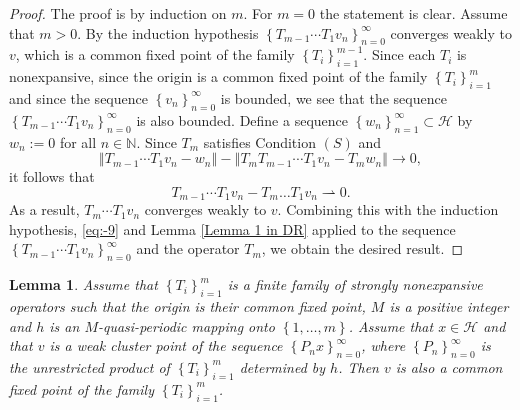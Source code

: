 \documentclass[]{interact}
\theoremstyle{plain}%
\newtheorem{lemma}[theorem]{Lemma}
\theoremstyle{definition}
\theoremstyle{remark}
\begin{document}
\begin{proof}
The proof is by induction on $m$. For $m=0$ the statement is clear.
Assume that $m>0$. By the induction hypothesis $\left\{ T_{m-1}\cdots T_{1}v_{n}\right\} _{n=0}^{\infty}$
converges weakly to $v$, which is a common fixed point of the family
$\left\{ T_{i}\right\} _{i=1}^{m-1}$. Since each $T_{i}$ is nonexpansive,
since the origin is a common fixed point of the family $\left\{ T_{i}\right\} _{i=1}^{m}$
and since the sequence $\left\{ v_{n}\right\} _{n=0}^{\infty}$ is bounded, we
see that the sequence $\left\{ T_{m-1}\cdots T_{1}v_{n}\right\} _{n=0}^{\infty}$
is also bounded. Define a sequence $\left\{ w_{n}\right\} _{n=1}^{\infty}\subset\mathcal{H}$
by $w_{n}:=0$ for all $n\in\mathbb{N}$. Since $T_{m}$ satisfies
Condition $\left(S\right)$ and
\[
\left\Vert T_{m-1}\cdots T_{1}v_{n}-w_{n}\right\Vert -\left\Vert T_{m}T_{m-1}\cdots T_{1}v_{n}-T_{m}w_{n}\right\Vert \rightarrow0,
\]
it follows that
\[
T_{m-1}\cdots T_{1}v_{n}-T_{m}\dots T_{1}v_{n}\rightharpoonup0.
\]
As a result, $T_{m}\cdots T_{1}v_{n}$ converges weakly to $v$. Combining
this with the induction hypothesis, \eqref{eq:-9} and Lemma \ref{Lemma 1 in DR}
applied to the sequence $\left\{ T_{m-1}\cdots T_{1}v_{n}\right\} _{n=0}^{\infty}$
and the operator $T_{m}$, we obtain the desired result.
\end{proof}
\begin{lemma}
\label{lem 5}Assume that $\left\{ T_{i}\right\} _{i=1}^{m}$ is a
finite family of strongly nonexpansive operators such that the origin
is their common fixed point, $M$ is a positive integer and $h$ is
an $M$-quasi-periodic mapping onto $\left\{ 1,\dots,m\right\}$.
Assume that $x\in\mathcal{H}$ and that $v$ is a weak cluster point of the
sequence $\left\{ P_{n}x\right\} _{n=0}^{\infty}$, where $\left\{ P_{n}\right\} _{n=0}^{\infty}$
is the \color{black}unrestricted \color{black} product of $\left\{ T_{i}\right\} _{i=1}^{m}$ determined
by $h$. Then $v$ is also a common fixed point of the family $\left\{ T_{i}\right\} _{i=1}^{m}$.
\end{lemma}
\end{document}
